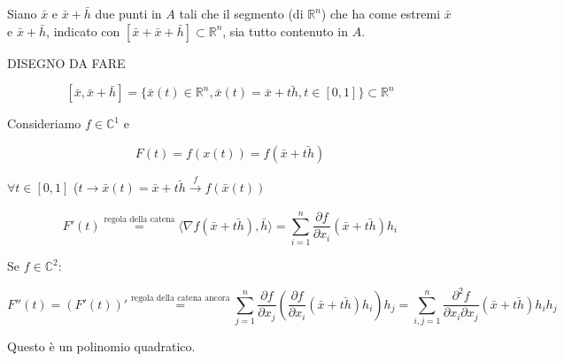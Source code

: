 \documentclass[../appunti-analisi.tex]{subfiles}
\begin{document}
Siano $\bar{x}$ e $\bar{x} +\bar{h} $ due punti in $A$ tali che il segmento (di $\mathbb{R}^{n}$) che ha come estremi $\bar{x} $ e $\bar{x} + \bar{h} $, indicato con $[\bar{x} +\bar{x} +\bar{h} ] \subset \mathbb{R}^{n}$, sia tutto contenuto in $A$.

DISEGNO DA FARE

       \[
           [\bar{x} , \bar{x} +\bar{h} ] = \{\bar{x} (t) \in \mathbb{R}^{n}, \bar{x} (t) = \bar{x} +\bar{th}, t \in [0,1]\} \subset \mathbb{R}^{n}
       \]

       Consideriamo $f \in \mathbb{C}^{1}$ e 

       \[
           F(t) = f(x(t)) = f(\bar{x} +\bar{th} ) 
       \]

       $\forall t \in [0,1]$ ($t \rightarrow  \bar{x} (t) = \bar{x} + \bar{th} \xrightarrow[]{\text{$f$}}f(\bar{x} (t))$

       \[
           F'(t) \overset{\text{regola della catena}}{=} \langle \nabla f(\bar{x} +\bar{th} ),\bar{h}  \rangle = \sum^{n}_{i=1} \frac{\partial f}{\partial x_i} (\bar{x} +\bar{th} ) h_i
       \]

       Se $f \in  \mathbb{C}^{2}$:

       \[
           F''(t) = (F'(t))' \overset{\text{regola della catena ancora}}{=} \sum^{n}_{j=1} \frac{\partial f}{\partial x_j} ( \frac{\partial f}{\partial x_i}(\bar{x} +\bar{th} ) h_i) h_j = \sum^{n}_{i,j=1} \frac{\partial^{2} f}{\partial x_i \partial x_j} (\bar{x} + \bar{th} ) h_i h_j
       \]

       Questo è un polinomio quadratico.
\end{document}
